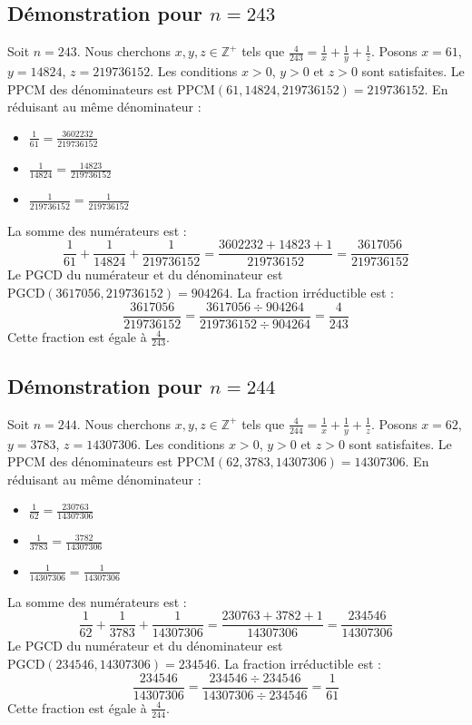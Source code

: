 \documentclass[11pt,a4paper]{article}
\begin{document}
\subsection{Démonstration pour $n = 243$}
Soit $n = 243$. Nous cherchons $x, y, z \in \mathbb{Z}^{+}$ tels que $\frac{4}{243} = \frac{1}{x} + \frac{1}{y} + \frac{1}{z}$.
Posons $x = 61$, $y = 14824$, $z = 219736152$.
Les conditions $x > 0$, $y > 0$ et $z > 0$ sont satisfaites.
Le PPCM des dénominateurs est $\text{PPCM}(61, 14824, 219736152) = 219736152$.
En réduisant au même dénominateur :
\begin{itemize}
    \item $\frac{1}{61} = \frac{3602232}{219736152}$
    \item $\frac{1}{14824} = \frac{14823}{219736152}$
    \item $\frac{1}{219736152} = \frac{1}{219736152}$
\end{itemize}
La somme des numérateurs est :
$$ \frac{1}{61} + \frac{1}{14824} + \frac{1}{219736152} = \frac{3602232 + 14823 + 1}{219736152} = \frac{3617056}{219736152} $$
Le PGCD du numérateur et du dénominateur est $\text{PGCD}(3617056, 219736152) = 904264$.
La fraction irréductible est :
$$ \frac{3617056}{219736152} = \frac{3617056 \div 904264}{219736152 \div 904264} = \frac{4}{243} $$
Cette fraction est égale à $\frac{4}{243}$.

\subsection{Démonstration pour $n = 244$}
Soit $n = 244$. Nous cherchons $x, y, z \in \mathbb{Z}^{+}$ tels que $\frac{4}{244} = \frac{1}{x} + \frac{1}{y} + \frac{1}{z}$.
Posons $x = 62$, $y = 3783$, $z = 14307306$.
Les conditions $x > 0$, $y > 0$ et $z > 0$ sont satisfaites.
Le PPCM des dénominateurs est $\text{PPCM}(62, 3783, 14307306) = 14307306$.
En réduisant au même dénominateur :
\begin{itemize}
    \item $\frac{1}{62} = \frac{230763}{14307306}$
    \item $\frac{1}{3783} = \frac{3782}{14307306}$
    \item $\frac{1}{14307306} = \frac{1}{14307306}$
\end{itemize}
La somme des numérateurs est :
$$ \frac{1}{62} + \frac{1}{3783} + \frac{1}{14307306} = \frac{230763 + 3782 + 1}{14307306} = \frac{234546}{14307306} $$
Le PGCD du numérateur et du dénominateur est $\text{PGCD}(234546, 14307306) = 234546$.
La fraction irréductible est :
$$ \frac{234546}{14307306} = \frac{234546 \div 234546}{14307306 \div 234546} = \frac{1}{61} $$
Cette fraction est égale à $\frac{4}{244}$.
\end{document}
